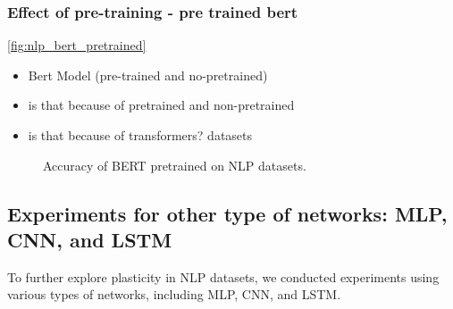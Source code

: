 \subsubsection{Effect of pre-training - pre trained bert}
\autoref{fig:nlp_bert_pretrained}
\begin{itemize}
    \item Bert Model (pre-trained and no-pretrained)
    \item is that because of pretrained and non-pretrained
    \item is that because of transformers?
          datasets %
\end{itemize}


\begin{figure}[htb!]
    \centering
    \caption{Accuracy of BERT pretrained on NLP datasets.}
    \label{fig:nlp_bert_pretrained}
\end{figure}



\subsection{Experiments for other type of networks: MLP, CNN, and LSTM}

To further explore plasticity in NLP datasets, we conducted experiments using various types of networks, including MLP, CNN, and LSTM.

